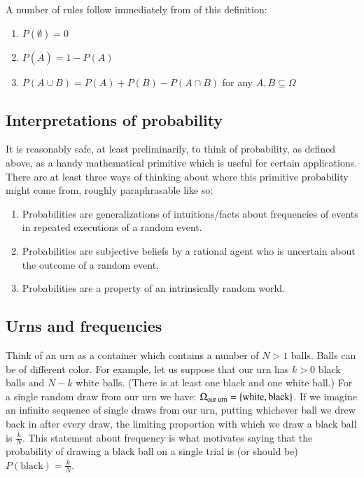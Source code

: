 \documentclass[nobib,nofonts]{tufte-handout}
\begin{document}
A number of rules follow immediately from of this definition:
\begin{enumerate}[{C}1.]
\item $P(\emptyset) = 0$
\item $P(\overline{A}) = 1 - P(A)$
\item $P(A \cup B) = P(A) + P(B) - P(A \cap B)$ for any $A, B \subseteq \Omega$
\end{enumerate}


\subsection{Interpretations of probability}

It is reasonably safe, at least preliminarily, to think of probability, as defined above, as a
handy mathematical primitive which is useful for certain applications. There are at least three
ways of thinking about where this primitive probability might come from, roughly paraphrasable
like so:
\begin{enumerate}[1.]
\item {} Probabilities are generalizations of intuitions/facts about frequencies of events in
  repeated executions of a random event.
\item {} Probabilities are subjective beliefs by a rational agent who is
  uncertain about the outcome of a random event.
\item {} Probabilities are a property of an intrinsically random world.
\end{enumerate}

\subsection{Urns and frequencies}

Think of an urn as a container which contains a number of $N > 1$ balls. Balls can be of
different color. For example, let us suppose that our urn has $k > 0$ black balls and $N-k$
white balls. (There is at least one black and one white ball.) For a single random draw from
our urn we have: $\Omega_{\text{our urn}} = \left\{\text{white}, \text{black}\right\}$. If we imagine an
infinite sequence of single draws from our urn, putting whichever ball we drew back in after
every draw, the limiting proportion with which we draw a black ball is
$\frac{k}{N}$. This
statement about frequency is what motivates saying that the probability of drawing a black ball
on a single trial is (or should be)
$P(\text{black}) = \frac{k}{N}$.
\end{document}

